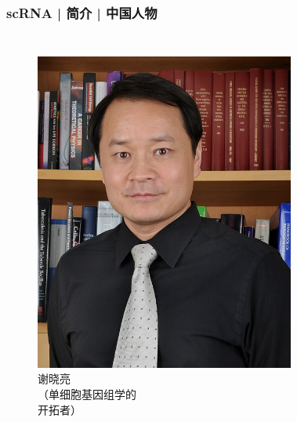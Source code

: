 \documentclass[11pt]{ctexbeamer}
\begin{document}
\begin{frame}
  \frametitle{scRNA | 简介 | 中国人物}
  \begin{columns}
     \begin{figure}
    \centering
    \includegraphics[width=\textwidth]{people_Xie.png}
    谢晓亮\\
    （单细胞基因组学的\\开拓者）
  \end{figure}
       \begin{figure}
    \centering

\end{figure}
\end{columns}
\end{frame}
\end{document}
